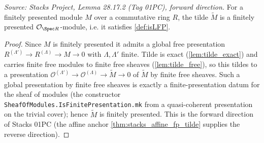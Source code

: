 \begin{lemma}
  \label{lem:tilde_isFP}
  \textit{Source: Stacks Project, Lemma 28.17.2 (Tag 01PC), forward direction.}
  For a finitely presented module $M$ over a commutative ring $R$, the tilde
  $\widetilde M$ is a finitely presented $\mathcal{O}_{\Spec R}$-module, i.e. it
  satisfies \cref{def:isLFP}.
  \begin{proof}
    Since $M$ is finitely presented it admits a global free presentation
    $R^{(\Lambda')} \to R^{(\Lambda)} \to M \to 0$ with $\Lambda, \Lambda'$
    finite. Tilde is exact (\cref{lem:tilde_exact}) and carries finite free
    modules to finite free sheaves (\cref{lem:tilde_free}), so this tildes to a
    presentation $\mathcal{O}^{(\Lambda')} \to \mathcal{O}^{(\Lambda)} \to
    \widetilde M \to 0$ of $\widetilde M$ by finite free sheaves. Such a global
    presentation by finite free sheaves is exactly a finite-presentation datum
    for the sheaf of modules (the constructor
    \texttt{SheafOfModules.IsFinitePresentation.mk} from a quasi-coherent
    presentation on the trivial cover); hence $\widetilde M$ is finitely
    presented. This is the forward direction of Stacks 01PC (the affine anchor
    \cref{thm:stacks_affine_fp_tilde} supplies the reverse direction).
  \end{proof}
\end{lemma}

